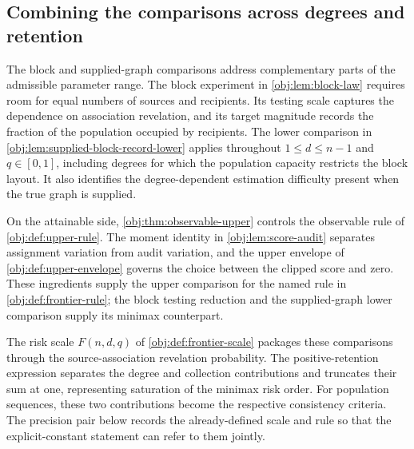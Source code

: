 \subsection{Combining the comparisons across degrees and retention}

The block and supplied-graph comparisons address complementary parts of the admissible parameter range. The block experiment in \cref{obj:lem:block-law} requires room for equal numbers of sources and recipients. Its testing scale captures the dependence on association revelation, and its target magnitude records the fraction of the population occupied by recipients. The lower comparison in \cref{obj:lem:supplied-block-record-lower} applies throughout \(1\le d\le n-1\) and \(q\in[0,1]\), including degrees for which the population capacity restricts the block layout. It also identifies the degree-dependent estimation difficulty present when the true graph is supplied.

On the attainable side, \cref{obj:thm:observable-upper} controls the observable rule of \cref{obj:def:upper-rule}. The moment identity in \cref{obj:lem:score-audit} separates assignment variation from audit variation, and the upper envelope of \cref{obj:def:upper-envelope} governs the choice between the clipped score and zero. These ingredients supply the upper comparison for the named rule in \cref{obj:def:frontier-rule}; the block testing reduction and the supplied-graph lower comparison supply its minimax counterpart.

The risk scale \(F(n,d,q)\) of \cref{obj:def:frontier-scale} packages these comparisons through the source-association revelation probability. The positive-retention expression separates the degree and collection contributions and truncates their sum at one, representing saturation of the minimax risk order. For population sequences, these two contributions become the respective consistency criteria. The precision pair below records the already-defined scale and rule so that the explicit-constant statement can refer to them jointly.

